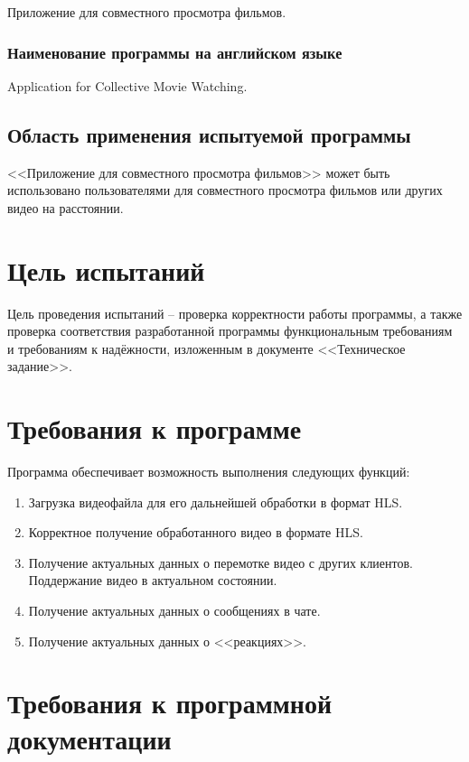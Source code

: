 \documentclass{../../includes/TechDoc}
\begin{document}
    Приложение для совместного просмотра фильмов.

    \subsubsection{Наименование программы на английском языке}

    Application for Collective Movie Watching.

    \subsection{Область применения испытуемой программы}

    <<Приложение для совместного просмотра фильмов>> может быть использовано пользователями для совместного просмотра фильмов или других видео на расстоянии.

    \section{Цель испытаний}

    Цель проведения испытаний -- проверка корректности работы программы, а также проверка соответствия разработанной программы функциональным требованиям и требованиям к надёжности, изложенным в документе <<Техническое задание>>.

    \section{Требования к программе}

    Программа обеспечивает возможность выполнения следующих функций:
    \begin{enumerate}
        \item Загрузка видеофайла для его дальнейшей обработки в формат HLS.
        \item Корректное получение обработанного видео в формате HLS.
        \item Получение актуальных данных о перемотке видео с других клиентов.
        Поддержание видео в актуальном состоянии.
        \item Получение актуальных данных о сообщениях в чате.
        \item Получение актуальных данных о <<реакциях>>.
    \end{enumerate}

    \section{Требования к программной документации}
\end{document}
